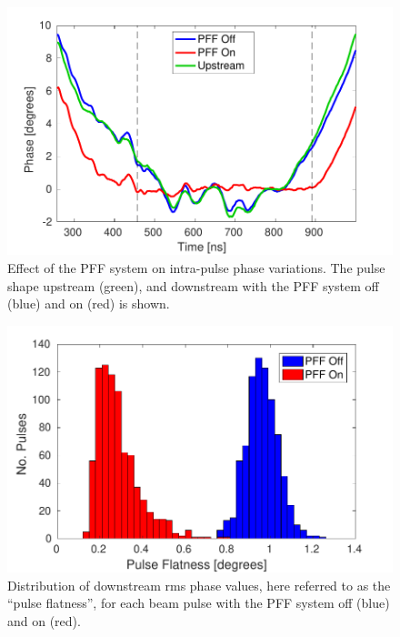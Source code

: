 \documentclass[%
 reprint,
superscriptaddress,
 amsmath,amssymb,
 prl,
]{revtex4-1}
\begin{document}


\begin{figure}
	\includegraphics[width=\columnwidth]{figs/shape}%
	\caption{\label{fig:shape}Effect of the PFF system on intra-pulse phase 
		variations. The pulse shape upstream (green), and downstream with the 
		PFF 
		system off (blue) and on (red) is shown.}
\end{figure}

\begin{figure}
	\includegraphics[width=\columnwidth]{figs/flatness}%
	\caption{\label{fig:flatness}Distribution of downstream rms phase values, 
		here 
		referred to as the 
		``pulse flatness'', for each beam pulse with the PFF system off (blue) 
		and 
		on (red).}
\end{figure}
\end{document}
